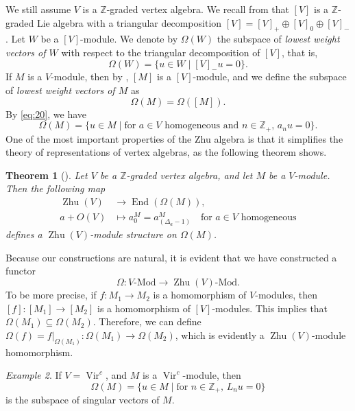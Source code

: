 \documentclass[a4paper, 12pt, reqno]{amsart}
\newtheorem{theorem}{Theorem}[section]
\theoremstyle{remark}
\newtheorem{example}[theorem]{Example}
\DeclareMathOperator{\Vir}{Vir}
\DeclareMathOperator{\End}{End}
\DeclareMathOperator{\Zhu}{Zhu}
\begin{document}
We still assume $V$ is a $\mathbb{Z}$-graded vertex algebra.
We recall from  that $[V]$ is a $\mathbb{Z}$-graded Lie algebra with a triangular decomposition $[V] = [V]_+ \oplus [V]_0 \oplus [V]_-$.
Let $W$ be a $[V]$-module.
We denote by $\Omega(W)$ the subspace of \emph{lowest weight vectors of $W$} with respect to the triangular decomposition of $[V]$, that is,
\begin{equation*}
  \Omega(W) = \{u \in W \mid [V]_-u = 0\}.
\end{equation*}
If $M$ is a $V$-module, then by , $[M]$ is a $[V]$-module, and we define the subspace of \emph{lowest weight vectors of $M$} as
\begin{equation*}
  \Omega(M) = \Omega([M]).
\end{equation*}
By \eqref{eq:20}, we have
\begin{equation*}
  \Omega(M) = \{u \in M \mid \text{for $a \in V$ homogeneous and $n \in \mathbb{Z}_+$, $a_nu = 0$}\}.
\end{equation*}
One of the most important properties of the Zhu algebra is that it simplifies the theory of representations of vertex algebras, as the following theorem shows.

\begin{theorem}[{\cite[Theorem 5.3]{dong_twisted_1998}}]
  \label{thr:37}
  Let $V$ be a $\mathbb{Z}$-graded vertex algebra, and let $M$ be a $V$-module.
  Then the following map
  \begin{align*}
    \Zhu(V) &\to \End(\Omega(M)), \\
    a + O(V) &\mapsto a^M_0 = a^M_{(\Delta_a - 1)} \quad \text{for $a \in V$ homogeneous}
  \end{align*}
  defines a $\Zhu(V)$-module structure on $\Omega(M)$.
\end{theorem}

Because our constructions are natural, it is evident that we have constructed a functor
\begin{equation*}
  \Omega: \text{$V$-Mod} \to \text{$\Zhu(V)$-Mod}.
\end{equation*}
To be more precise, if $f: M_1 \to M_2$ is a homomorphism of $V$-modules, then $[f]: [M_1] \to [M_2]$ is a homomorphism of $[V]$-modules.
This implies that $\Omega(M_1) \subseteq \Omega(M_2)$.
Therefore, we can define $\Omega(f) = f|_{\Omega(M_1)}: \Omega(M_1) \to \Omega(M_2)$, which is evidently a $\Zhu(V)$-module homomorphism.

\begin{example}
  \label{exa:13}
  If $V = \Vir^c$, and $M$ is a $\Vir^c$-module, then
  \begin{equation*}
    \Omega(M) = \{u \in M \mid \text{for $n \in \mathbb{Z}_+$, $L_nu = 0$}\}
  \end{equation*}
  is the subspace of singular vectors of $M$.
\end{example}
\end{document}
